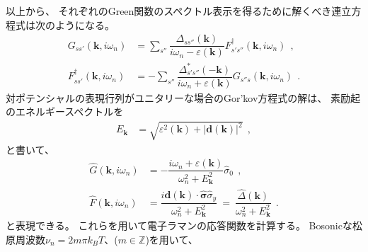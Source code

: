 \documentclass[a4j]{jsarticle}
\begin{document}
以上から、
それぞれのGreen関数のスペクトル表示を得るために解くべき連立方程式は次のようになる。
\begin{align}
	G_{ss'}(\bm{k} , i \omega_{n} )
	 & =
	\sum_{s''}
	\dfrac{
		\Delta_{ s s'' }( \bm{k} )
	}{
		i \omega_{n} - \varepsilon( \bm{k} )
	}
	F_{ s' s'' }^{\dagger} ( \bm{k} , i \omega_{n} )
	\ \ ,
	\\[4mm]
	F_{ss'}^{\dagger} (\bm{k} , i \omega_{n} )
	 & =
	-
	\sum_{ s'' }
	\dfrac{
		\Delta_{ s' s'' }^{*} ( - \bm{k} )
	}
	{
		i \omega_{n} + \varepsilon( \bm{k} )
	}
	G_{s''s} (\bm{k} , i \omega_{n} )
	\ \ .
\end{align}
対ポテンシャルの表現行列がユニタリーな場合のGor'kov方程式の解は、
素励起のエネルギースペクトルを
\begin{align}
	E_{\bm{k}}
	 & =
	\sqrt{
		\varepsilon^{2}(\bm{k}) + | \bm{d}(\bm{k}) |^{2}
	}
	\ \ ,
\end{align}
と書いて、
\begin{align}
	\hat{G}(\bm{k} , i \omega_{n})
	 & =
	-
	\dfrac{ i \omega_{n} + \varepsilon(\bm{k}) }
	{ \omega_{n}^{2} + E_{\bm{k}}^{2} }
	\hat{\sigma}_{0}
	\ \ ,
	\\[2mm]
	\hat{F}(\bm{k},i \omega_{n})
	 & =
	\dfrac{ i \bm{d}(\bm{k}) \cdot \hat{\bm{\sigma}} \hat{\sigma}_{y} }
	{ \omega_{n}^{2} + E_{\bm{k}}^{2} }
	\ = \
	\dfrac{ \hat{\Delta}(\bm{k}) }
	{ \omega_{n}^{2} + E_{\bm{k}}^{2} }
	\ \ .
\end{align}
と表現できる。
これらを用いて電子ラマンの応答関数を計算する。
Bosonicな松原周波数$\nu_{n}=2m\pi k_{B} T$、($m \in \mathbb{Z}$)を用いて、
\end{document}
